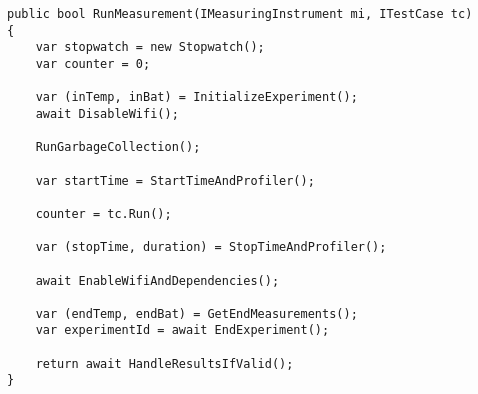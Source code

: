 

\begin{lstlisting}[caption=The method running the test case, label={lst:run_experiments}]
public bool RunMeasurement(IMeasuringInstrument mi, ITestCase tc)
{
    var stopwatch = new Stopwatch();
    var counter = 0;

    var (inTemp, inBat) = InitializeExperiment();
    await DisableWifi();

    RunGarbageCollection();

    var startTime = StartTimeAndProfiler();

    counter = tc.Run();

    var (stopTime, duration) = StopTimeAndProfiler();

    await EnableWifiAndDependencies();

    var (endTemp, endBat) = GetEndMeasurements();
    var experimentId = await EndExperiment();

    return await HandleResultsIfValid();
}
    \end{lstlisting}
